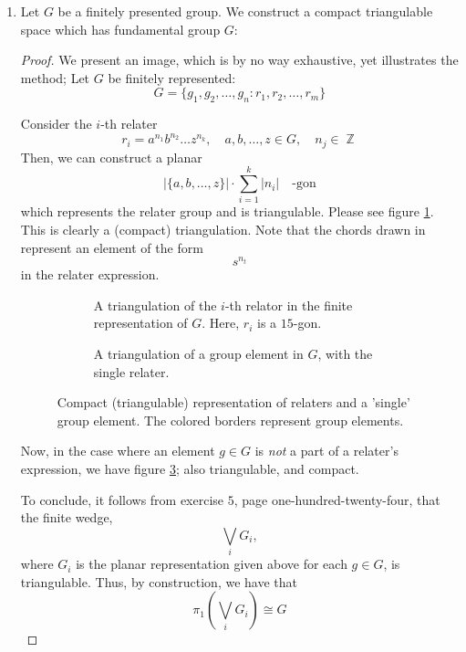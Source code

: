 \documentclass{book}
\DeclareMathOperator*{\Z}{\mathbb{Z}}
\begin{document}
\begin{enumerate}[(1)]
    \item Let $G$ be a finitely presented group. We construct a compact triangulable space which has fundamental group $G$:
        \begin{proof} We present an image, which is by no way exhaustive, yet illustrates the method; Let $G$ be finitely represented: 
            \[G = \{g_1, g_2, \dots, g_n : r_1, r_2, \dots, r_m\}\]
            \par Consider the $i$-th relater 
            \[r_i = a^{n_1}b^{n_2} \dots z^{n_k}, \quad a,b, \dots, z \in G, \quad n_j \in \Z\]
            Then, we can construct a planar 
            \[ |\{a,b, \dots, z\}| \cdot \sum_{i = 1}^k |n_i| \quad \text{-gon} \]
            which represents the relater group and is triangulable. Please see figure \hyperref[fig:tikz:triCompact]{\ref{fig:tikz:triCompact}}. This is clearly a (compact) triangulation. Note that the chords drawn in represent an element of the form 
            \[s^{n_t}\] 
            in the relater expression. 
            \begin{figure}[!tbp]
                \begin{subfigure}[b]{0.4\textwidth}
                    
                    \caption{A triangulation of the $i$-th relator in the finite representation of $G$. Here, $r_i$ is a $15$-gon.}
                    \label{fig:tikz:triCompact}
                \end{subfigure}
                \hfill
                \begin{subfigure}[b]{0.4\textwidth}
                    
                    \caption{A triangulation of a group element in $G$, with the single relater.}
                    \label{fig:tikz:triGen}
                \end{subfigure}
                \caption{Compact (triangulable) representation of relaters and a 'single' group element. The colored borders represent group elements.}
            \end{figure}
            \par Now, in the case where an element $g \in G$ is \textit{not} a part of a relater's expression, we have figure \hyperref[fig:tikz:triGen]{\ref{fig:tikz:triGen}}; also triangulable, and compact. 
            \par To conclude, it follows from exercise $5$, page one-hundred-twenty-four, that the finite wedge, 
            \[\bigvee_{i} G_i,\]
            where $G_i$ is the planar representation given above for each $g \in G$, is triangulable. Thus, by construction, we have that 
            \[\pi_1 \left( \bigvee_{i} G_i \right) \cong G\]
        \end{proof}
\end{enumerate}
\end{document}
